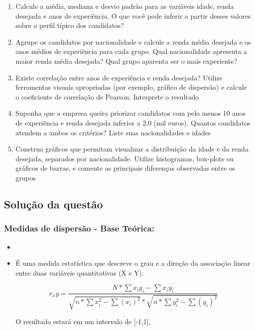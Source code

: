 \documentclass[a4paper,11pt]{article}
\begin{document}
\begin{enumerate}[leftmargin=*]
\item Calcule a média, mediana e desvio padrão para as variáveis idade, renda desejada e
anos de experiência. O que você pode inferir a partir desses valores sobre o perfil típico dos candidatos?

\item  Agrupe os candidatos por nacionalidade e calcule a renda média desejada e os anos
médios de experiência para cada grupo. Qual nacionalidade apresenta a maior renda
média desejada? Qual grupo aparenta ser o mais experiente?

\item Existe correlação entre anos de experiência e renda desejada? Utilize ferramentas visuais apropriadas (por exemplo, gráfico de dispersão) e calcule o coeficiente de correlação
de Pearson. Interprete o resultado

\item Suponha que a empresa queira priorizar candidatos com pelo menos 10 anos de experiência e renda desejada inferior a 2,0 (mil euros). Quantos candidatos atendem a ambos
os critérios? Liste suas nacionalidades e idades

\item Construa gráficos que permitam visualizar a distribuição da idade e da renda desejada,
separados por nacionalidade. Utilize histogramas, box-plots ou gráficos de barras, e
comente as principais diferenças observadas entre os grupos

\end{enumerate}

\subsection*{Solução da questão} 					

\subsubsection*{Medidas de dispersão - Base Teórica:} 

\begin{itemize}
\item[]

    \item É uma medida estatística que descreve o grau e a direção da associação linear entre duas variáveis quantitativas (X e Y).

    \[r_xy = \frac{N*\sum{x_iy_i} - \sum{x_iy_i}}{\sqrt{n*\sum x_i^2 - \sum (x_i)^2} * \sqrt{n*\sum y_i^2 - \sum (y_i)^2}}\]

    O resultado estará em um intervalo de [-1,1], 

\end{itemize}
\end{document}
